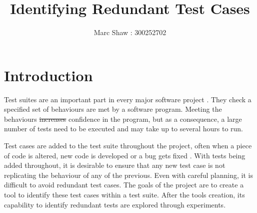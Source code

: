 \documentclass[11pt
              , a4paper
              , twoside
              , openright
              ]{report}
\title{Identifying Redundant Test Cases}
\author{Marc Shaw : 300252702}
\date{}
\providecommand{\DIFadd}[1]{{\protect\color{blue}\uwave{#1}}} %
\providecommand{\DIFdel}[1]{{\protect\color{red}\sout{#1}}}                      %
\providecommand{\DIFaddbegin}{} %
\providecommand{\DIFaddend}{} %
\providecommand{\DIFdelbegin}{} %
\providecommand{\DIFdelend}{} %
\begin{document}
\frontmatter



\begin{abstract}


\end{abstract}


\maketitle

\tableofcontents


\listoftables


\mainmatter


 \newpage \chapter{Introduction}\label{C:intro}

Test suites are an important part in every major software project \cite{jeffrey2005test}. They check a specified set of behaviours are met by a software program. Meeting the behaviours \DIFdelbegin \DIFdel{increases }\DIFdelend \DIFaddbegin \DIFadd{increase the }\DIFaddend confidence in the program, but as a consequence, a large number of tests need to be executed and may take up to several hours to run.

Test cases are added to the test suite throughout the project, often when a piece of code is altered, new code is developed or a bug gets fixed \cite{issuetrack,whentotest}. With tests being added throughout, it is desirable to ensure that any new test case is not replicating the behaviour of any of the previous. Even with careful planning, it is difficult to avoid redundant test cases. The goals of the project are to create a tool to identify these test cases within a test suite. After the tools creation, its capability to identify redundant tests are explored through experiments.
\end{document}
